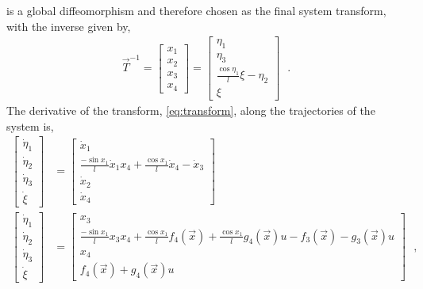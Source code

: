 is a global diffeomorphism and therefore chosen as the final system transform, with the inverse given by,
\begin{align}
  \vec{T}^{-1} = 
  \begin{bmatrix}
    x_1  \\
    x_2  \\
    x_3  \\
    x_4
  \end{bmatrix}
  =
  \begin{bmatrix}
  \eta_1   \\
  \eta_3   \\
  \frac{\cos \eta_1}{l} \xi - \eta_2  \\
  \xi
  \end{bmatrix} \ \ \ .
  \label{eq:inverseTransform}
\end{align}
%
The derivative of the transform, \autoref{eq:transform}, along the trajectories of the system is,
\begin{align}
  \begin{bmatrix}
    \dot{\eta}_1   \\
    \dot{\eta}_2   \\
    \dot{\eta}_3   \\
    \dot{\xi}
  \end{bmatrix}
  &=
  \begin{bmatrix}
    \dot{x}_1   \\
    \frac{-\sin x_1}{l}\dot{x}_1 x_4 + \frac{\cos x_1}{l} \dot{x}_4 - \dot{x}_3  \\
    \dot{x}_2   \\
    \dot{x}_4
  \end{bmatrix} \label{eq:transform_dt} \\
  \begin{bmatrix}
  \dot{\eta}_1   \\
  \dot{\eta}_2   \\
  \dot{\eta}_3   \\
  \dot{\xi}
  \end{bmatrix} 
  &=
  \begin{bmatrix}
    x_3    \\
    \frac{-\sin x_1}{l} x_3 x_4 + \frac{\cos x_1}{l} f_4(\vec{x}) + \frac{\cos x_1}{l} g_4(\vec{x}) u  - f_3(\vec{x}) - g_3(\vec{x}) u \\
    x_4    \\ 
    f_4(\vec{x}) + g_4(\vec{x}) u 
  \end{bmatrix} \ \ \ , \label{eq:transform_dt_alongTraj}
\end{align}
